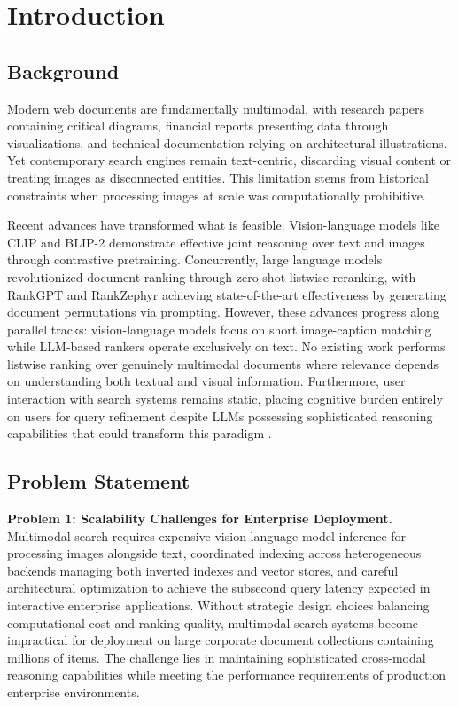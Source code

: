 \chapter{Introduction}

\section{Background}

Modern web documents are fundamentally multimodal, with research papers containing critical diagrams, financial reports presenting data through visualizations, and technical documentation relying on architectural illustrations. Yet contemporary search engines remain text-centric, discarding visual content or treating images as disconnected entities. This limitation stems from historical constraints when processing images at scale was computationally prohibitive.

Recent advances have transformed what is feasible. Vision-language models like CLIP \cite{radford2021learning} and BLIP-2 \cite{li2023blip2} demonstrate effective joint reasoning over text and images through contrastive pretraining. Concurrently, large language models revolutionized document ranking through zero-shot listwise reranking, with RankGPT \cite{sun2023chatgpt} and RankZephyr \cite{pradeep2023rankzephyr} achieving state-of-the-art effectiveness by generating document permutations via prompting. However, these advances progress along parallel tracks: vision-language models focus on short image-caption matching while LLM-based rankers operate exclusively on text. No existing work performs listwise ranking over genuinely multimodal documents where relevance depends on understanding both textual and visual information. Furthermore, user interaction with search systems remains static, placing cognitive burden entirely on users for query refinement despite LLMs possessing sophisticated reasoning capabilities that could transform this paradigm \cite{lewis2020retrieval, asai2024self}.

\section{Problem Statement}

\textbf{Problem 1: Scalability Challenges for Enterprise Deployment.} Multimodal search requires expensive vision-language model inference for processing images alongside text, coordinated indexing across heterogeneous backends managing both inverted indexes and vector stores, and careful architectural optimization to achieve the subsecond query latency expected in interactive enterprise applications. Without strategic design choices balancing computational cost and ranking quality, multimodal search systems become impractical for deployment on large corporate document collections containing millions of items. The challenge lies in maintaining sophisticated cross-modal reasoning capabilities while meeting the performance requirements of production enterprise environments.

